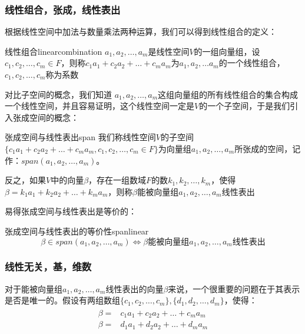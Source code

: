         \subsubsection{线性组合，张成，线性表出}
            根据线性空间中加法与数量乘法两种运算，我们可以得到线性组合的定义：
            \begin{definition}{线性组合}{linearcombination}
               $a_1,a_2,\ldots,a_m$是线性空间$V$的一组向量组，设$c_1,c_2,\ldots ,c_m\in F$，则称$c_1a_1+c_2a_2+\ldots +c_ma_m$为$a_1,a_2,\ldots a_m$的一个线性组合，$c_1,c_2,\ldots ,c_m$称为系数
            \end{definition}
            对比子空间的概念，我们知道 $a_1,a_2,\ldots,a_m$这组向量组的所有线性组合的集合构成一个线性空间，并且容易证明，这个线性空间一定是$V$的一个子空间，于是我们引入张成空间的概念：
            \begin{definition}{张成空间与线性表出}{span}
            我们称线性空间$V$的子空间$\{c_1a_1+c_2a_2+\ldots +c_ma_m, c_1,c_2,\ldots ,c_m\in F\}$为向量组$a_1,a_2,\ldots,a_m$所张成的空间，记作：$span(a_1,a_2,\ldots,a_m)$。
            
            反之，如果$V$中的向量$\beta$，存在一组数域$F$的数$k_1,k_2,\ldots ,k_m$，使得$\beta=k_1a_1+k_2a_2+\ldots +k_ma_m$，则称$\beta$能被向量组$a_1,a_2,\ldots,a_m$线性表出
            \end{definition}
            
            易得张成空间与线性表出是等价的：
            
            \begin{corollary}{张成空间与线性表出的等价性}{spanlinear}
                \begin{equation*}
                    \beta \in span(a_1,a_2,\ldots,a_m)\Longleftrightarrow \beta \textrm{能被向量组}a_1,a_2,\ldots,a_m \textrm{线性表出}
                \end{equation*}
            \end{corollary}
            
        \subsubsection{线性无关，基，维数}
        对于$\textrm{能被向量组}a_1,a_2,\ldots,a_m \textrm{线性表出}$的向量$\beta$来说，一个很重要的问题在于其表示是否是唯一的。假设有两组数组$\{c_1,c_2,\ldots ,c_m \},\{d_1,d_2,\ldots ,d_m \}$，使得：
            \begin{align}
                \begin{split}
                    \beta =&c_1a_1+c_2a_2+\ldots +c_ma_m\\
                    \beta =&d_1a_1+d_2a_2+\ldots +d_ma_m\\
                \end{split}
            \end{align}
            
